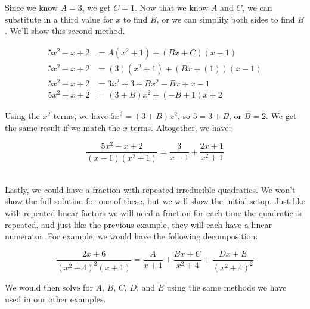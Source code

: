 {Since we know $A=3$, we get $C=1$. Now that we know $A$ and $C$, we can substitute in a third value for $x$ to find $B$, or we can simplify both sides to find $B$. We'll show this second method.

\begin{equation*}
	\begin{split}
		5x^2-x+2 &= A(x^2+1) + (Bx+C)(x-1) \\
		5x^2-x+2 &= (3)(x^2+1) + (Bx+(1))(x-1) \\
		5x^2-x+2 & = 3x^2+3 + Bx^2 - Bx +x -1 \\
		5x^2-x+2 &= (3+B)x^2 + (-B+1)x + 2
	\end{split}
\end{equation*}

Using the $x^2$ terms, we have $5x^2 = (3+B)x^2$, so $5=3+B$, or $B=2$. We get the same result if we match the $x$ terms. Altogether, we have:

\begin{equation*}
	\frac{5x^2-x+2}{(x-1)(x^2+1)} = \frac{3}{x-1} + \frac{2x+1}{x^2+1}
\end{equation*}


}\\

Lastly, we could have a fraction with repeated irreducible quadratics. We won't show the full solution for one of these, but we will show the initial setup. Just like with repeated linear factors we will need a fraction for each time the quadratic is repeated, and just like the previous example, they will each have a linear numerator. For example, we would have the following decomposition:

\begin{equation*}
	\frac{2x+6}{(x^2+4)^2(x+1)} = \frac{A}{x+1} + \frac{Bx+C}{x^2+4} + \frac{Dx+E}{(x^2+4)^2}
\end{equation*}

We would then solve for $A$, $B$, $C$, $D$, and $E$ using the same methods we have used in our other examples.



